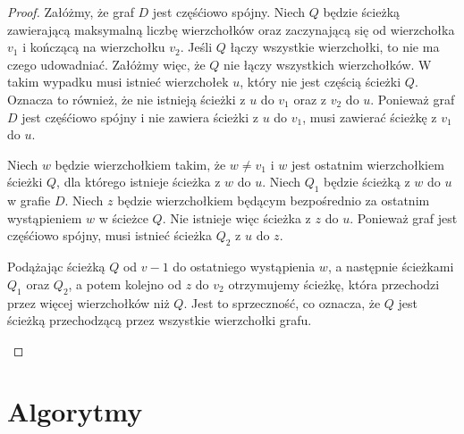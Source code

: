 \documentclass[a4paper,12pt]{mwart}
\begin{document}
\begin{proof}
  Załóżmy, że graf $D$ jest częśćiowo spójny. Niech $Q$ będzie ścieżką
  zawierającą maksymalną liczbę wierzchołków oraz zaczynającą się od
  wierzchołka $v_1$ i kończącą na wierzchołku $v_2$. Jeśli $Q$ łączy wszystkie
  wierzchołki, to nie ma czego udowadniać. Załóżmy więc, że $Q$ nie łączy
  wszystkich wierzchołków. W takim wypadku musi istnieć wierzchołek $u$, który
  nie jest częścią ścieżki $Q$. Oznacza to również, że nie istnieją ścieżki
  z $u$ do $v_1$ oraz z $v_2$ do $u$. Ponieważ graf $D$ jest częśćiowo spójny
  i nie zawiera ścieżki z $u$ do $v_1$, musi zawierać ścieżkę z $v_1$ do $u$.

  Niech $w$ będzie wierzchołkiem takim, że $w \neq v_1$ i $w$ jest ostatnim
  wierzchołkiem ścieżki $Q$, dla którego istnieje ścieżka z $w$ do $u$. Niech
  $Q_1$ będzie ścieżką z $w$ do $u$ w grafie $D$. Niech $z$ będzie wierzchołkiem
  będącym bezpośrednio za ostatnim wystąpieniem $w$ w ścieżce $Q$. Nie istnieje
  więc ścieżka z $z$ do $u$. Ponieważ graf jest częśćiowo spójny, musi istnieć
  ścieżka $Q_2$ z $u$ do $z$.

  Podążając ścieżką $Q$ od $v-1$ do ostatniego wystąpienia $w$, a następnie ścieżkami
  $Q_1$ oraz $Q_2$, a potem kolejno od $z$ do $v_2$ otrzymujemy ścieżkę, która
  przechodzi przez więcej wierzchołków niż $Q$. Jest to sprzeczność, co oznacza, że $Q$
  jest ścieżką przechodzącą przez wszystkie wierzchołki grafu.

\begin{figure}[H]
  \centering
\end{figure}

\end{proof}

\section{Algorytmy}
\end{document}
